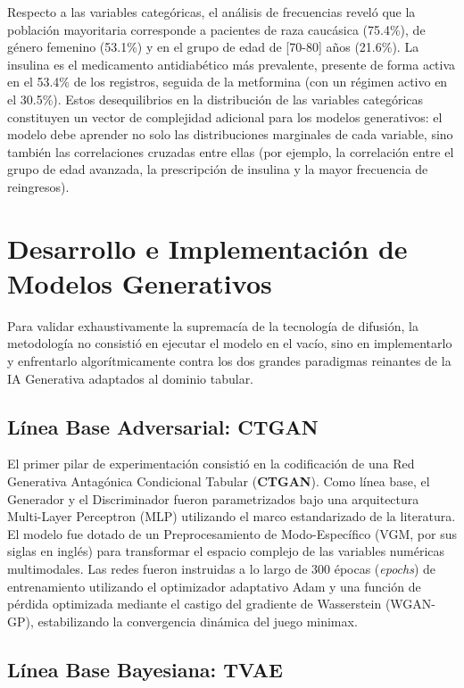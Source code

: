 Respecto a las variables categóricas, el análisis de frecuencias reveló que la población mayoritaria corresponde a pacientes de raza caucásica (75.4\%), de género femenino (53.1\%) y en el grupo de edad de [70-80] años (21.6\%). La insulina es el medicamento antidiabético más prevalente, presente de forma activa en el 53.4\% de los registros, seguida de la metformina (con un régimen activo en el 30.5\%). Estos desequilibrios en la distribución de las variables categóricas constituyen un vector de complejidad adicional para los modelos generativos: el modelo debe aprender no solo las distribuciones marginales de cada variable, sino también las correlaciones cruzadas entre ellas (por ejemplo, la correlación entre el grupo de edad avanzada, la prescripción de insulina y la mayor frecuencia de reingresos).

\section{Desarrollo e Implementación de Modelos Generativos}

Para validar exhaustivamente la supremacía de la tecnología de difusión, la metodología no consistió en ejecutar el modelo en el vacío, sino en implementarlo y enfrentarlo algorítmicamente contra los dos grandes paradigmas reinantes de la IA Generativa adaptados al dominio tabular.

\subsection{Línea Base Adversarial: CTGAN}

El primer pilar de experimentación consistió en la codificación de una Red Generativa Antagónica Condicional Tabular (\textbf{CTGAN}). Como línea base, el Generador y el Discriminador fueron parametrizados bajo una arquitectura Multi-Layer Perceptron (MLP) utilizando el marco estandarizado de la literatura. El modelo fue dotado de un Preprocesamiento de Modo-Específico (VGM, por sus siglas en inglés) para transformar el espacio complejo de las variables numéricas multimodales. Las redes fueron instruidas a lo largo de 300 épocas (\textit{epochs}) de entrenamiento utilizando el optimizador adaptativo Adam y una función de pérdida optimizada mediante el castigo del gradiente de Wasserstein (WGAN-GP), estabilizando la convergencia dinámica del juego minimax.

\subsection{Línea Base Bayesiana: TVAE}

